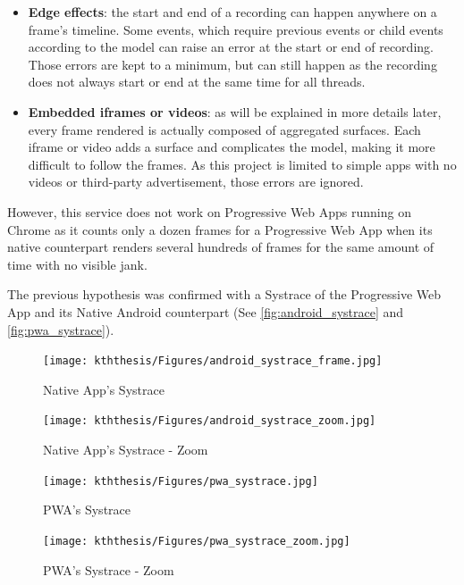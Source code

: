     \begin{itemize}
        \item \textbf{Edge effects}: the start and end of a recording can happen anywhere on a frame's timeline. Some events, which require previous events or child events according to the model can raise an error at the start or end of recording. Those errors are kept to a minimum, but can still happen as the recording does not always start or end at the same time for all threads.
        \item \textbf{Embedded iframes or videos}: as will be explained in more details later, every frame rendered is actually composed of aggregated surfaces. Each iframe or video adds a surface and complicates the model, making it more difficult to follow the frames. As this project is limited to simple apps with no videos or third-party advertisement, those errors are ignored. 
    \end{itemize}
    
    However, this service does not work on Progressive Web Apps running on Chrome as it counts only a dozen frames for a Progressive Web App when its native counterpart renders several hundreds of frames for the same amount of time with no visible jank. 
    
    
    The previous hypothesis was confirmed with a Systrace of the Progressive Web App and its Native Android counterpart (See  \autoref{fig:android_systrace} and \autoref{fig:pwa_systrace}).
    \begin{figure}[!ht]
        \texttt{[image: kththesis/Figures/android\_systrace\_frame.jpg]}
        \caption{Native App's Systrace}
        \label{fig:android_systrace}
        \texttt{[image: kththesis/Figures/android\_systrace\_zoom.jpg]}
        \caption{Native App's Systrace - Zoom}
        \label{fig:android_systrace_zoom}
    \end{figure}
    
    \begin{figure}[!ht]
        \centering
        \texttt{[image: kththesis/Figures/pwa\_systrace.jpg]}
        \caption{PWA's Systrace}
        \label{fig:pwa_systrace}
        \texttt{[image: kththesis/Figures/pwa\_systrace\_zoom.jpg]}
        \caption{PWA's Systrace - Zoom}
        \label{fig:pwa_systrace_zoom}
    \end{figure}
    
